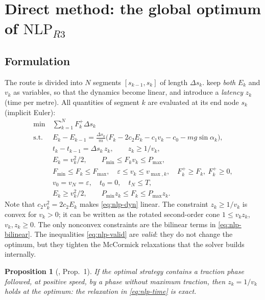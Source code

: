 \documentclass[11pt,a4paper]{article}
\newtheorem{proposition}{Proposition}
\newcommand{\NLP}{\text{NLP}_{R3}}
\begin{document}
\section{Direct method: the global optimum of $\NLP$}\label{sec:direct}

\subsection{Formulation}

The route is divided into $N$ segments $[s_{k-1}, s_k]$ of length $\Delta s_k$. \citet{Xiao2025} keep \emph{both} $E_k$
and $v_k$ as variables, so that the dynamics become linear, and introduce a \emph{latency} $z_k$ (time per metre). All
quantities of segment $k$ are evaluated at its end node $s_k$ (implicit Euler):
\begin{align}
  \min\ & \sum_{k=1}^N F_k^+ \Delta s_k \label{eq:nlp-obj}\\
  \text{s.t.}\ & E_k - E_{k-1} = \tfrac{\Delta s_k}{m}\big(F_k - 2c_2 E_k - c_1 v_k - c_0 - m g \sin\alpha_k\big),
     \label{eq:nlp-dyn}\\
  & t_k - t_{k-1} = \Delta s_k\, z_k, \qquad z_k \ge 1/v_k, \label{eq:nlp-time}\\
  & E_k = v_k^2/2, \qquad P_{\min} \le F_k v_k \le P_{\max}, \label{eq:nlp-bilinear}\\
  & F_{\min} \le F_k \le F_{\max}, \quad \varepsilon \le v_k \le v_{\max,k}, \quad F_k^+ \ge F_k,\ F_k^+ \ge 0,
     \label{eq:nlp-box}\\
  & v_0 = v_N = \varepsilon,\quad t_0 = 0,\quad t_N \le T, \label{eq:nlp-bc}\\
  & E_k \ge v_k^2/2, \qquad P_{\min} z_k \le F_k \le P_{\max} z_k. \label{eq:nlp-valid}
\end{align}
Note that $c_2 v_k^2 = 2 c_2 E_k$ makes \eqref{eq:nlp-dyn} linear. The constraint $z_k \ge 1/v_k$ is convex for
$v_k > 0$; it can be written as the rotated second-order cone $1 \le v_k z_k$, $v_k, z_k \ge 0$. The only nonconvex
constraints are the bilinear terms in \eqref{eq:nlp-bilinear}. The inequalities \eqref{eq:nlp-valid} are \emph{valid}:
they do not change the optimum, but they tighten the McCormick relaxations that the solver builds internally.

\begin{proposition}[\citealp{Xiao2025}, Prop.~1]
If the optimal strategy contains a traction phase followed, at positive speed, by a phase without maximum traction,
then $z_k = 1/v_k$ holds at the optimum: the relaxation in \eqref{eq:nlp-time} is exact.
\end{proposition}
\end{document}
